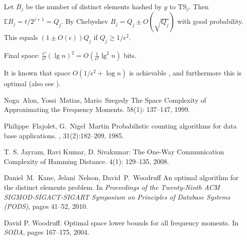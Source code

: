 \documentclass[11pt]{article}
\begin{document}
Let $B_j$ be the number of distinct elements hashed by $g$ to TS$_j$. Then $\mathbb EB_j = t/2^{j+1} = Q_j$. By Chebyshev $B_j = Q_j \pm O(\sqrt{Q_j})$ with good probability. This equals $(1 \pm O(\epsilon)) Q_j$ if $Q_j \geq 1/\epsilon^2$.

Final space: $\frac{C}{\epsilon^2} (\lg n)^2 = O(\frac 1{\epsilon^2} \lg^2 n)$ bits.

It is known that space $O(1/\epsilon^2 + \log n)$ is achievable \cite{KNW10}, and furthermore this is optimal \cite{AMS,Woodruff} (also see \cite{JKS}).



\begin{thebibliography}{42}

Noga~Alon, Yossi~Matias, Mario~Szegedy
\newblock The Space Complexity of Approximating the Frequency Moments. 
 58(1): 137--147, 1999.

Philippe~Flajolet, G.~Nigel~Martin
\newblock Probabilistic counting algorithms for data base applications.
, 31(2):182--209, 1985.

T. S. Jayram, Ravi Kumar, D. Sivakumar:
\newblock The One-Way Communication Complexity of Hamming Distance.
 4(1): 129--135, 2008.


Daniel~M.~Kane, Jelani~Nelson, David~P.~Woodruff
\newblock An optimal algorithm for the distinct elements problem.
\newblock In {\em Proceedings of the Twenty-Ninth ACM SIGMOD-SIGACT-SIGART Symposium on Principles of Database Systems (PODS)}, pages 41--52, 2010.

David P. Woodruff.
\newblock Optimal space lower bounds for all frequency moments.
\newblock In {\em SODA}, pages 167--175, 2004.

\end{thebibliography}
\end{document}
